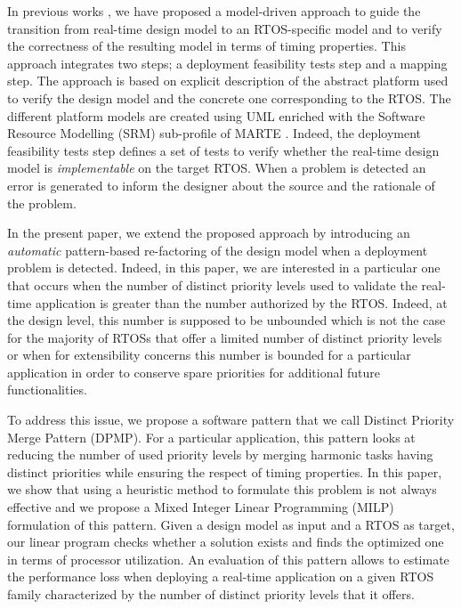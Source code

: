 \documentclass[runningheads,a4paper]{llncs}
\begin{document}
In previous works \cite{SEAA}\cite{models}, we have proposed a model-driven approach to guide the transition from real-time design model to an RTOS-specific model and to verify the correctness of the resulting model in terms of timing properties. This approach integrates two steps; a deployment feasibility tests step and a mapping step. The approach is based on explicit description of the abstract platform used to verify the design model and the concrete one corresponding to the RTOS. The different platform models are created using UML enriched with the Software Resource Modelling (SRM) sub-profile of MARTE \cite{SRM}. Indeed, the deployment feasibility tests step defines a set of tests to verify whether the real-time design model is \emph{implementable} on the target RTOS. When a problem is detected an error is generated to inform the designer about the source and the rationale of the problem.  

In the present paper, we extend the proposed approach by introducing an \emph{automatic} pattern-based re-factoring of the design model when a deployment problem is detected. Indeed, in this paper, we are interested in a particular one that occurs when the number of distinct priority levels used to validate the real-time application is greater than the number authorized by the RTOS. Indeed, at the design level, this number is supposed to be unbounded which is not the case for the majority of RTOSs that offer a limited number of distinct priority levels or when for extensibility concerns this number is bounded for a particular application in order to conserve spare priorities for additional future functionalities. 

To address this issue, we propose a software pattern that we call Distinct Priority Merge Pattern (DPMP). For a particular application, this pattern looks at reducing the number of used priority levels by merging harmonic tasks having distinct priorities while ensuring the respect of timing properties. In this paper, we show that using a heuristic method to formulate this problem is not always effective and we propose a Mixed Integer Linear Programming (MILP) formulation of this pattern. Given a design model as input and a RTOS as target, our linear program checks whether a solution exists and finds the optimized one in terms of processor utilization. An evaluation of this pattern allows to estimate the performance loss when deploying a real-time application on a given RTOS family characterized by the number of distinct priority levels that it offers.      
\end{document}
